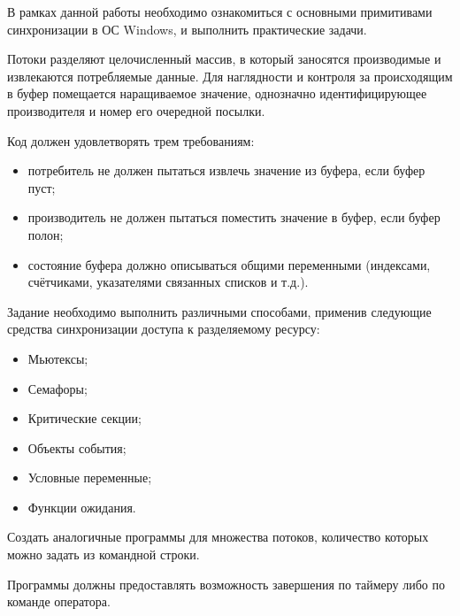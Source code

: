 \documentclass[a4paper, 12pt]{article}		%
\begin{document}
В рамках данной работы необходимо ознакомиться с основными примитивами синхронизации в ОС Windows, и выполнить практические задачи.
\vspace{2em}

Потоки разделяют целочисленный массив, в который заносятся производимые и извлекаются потребляемые данные. Для наглядности и контроля за происходящим в буфер помещается наращиваемое значение, однозначно идентифицирующее производителя и номер его очередной посылки.
\vspace{1em}

Код должен удовлетворять трем требованиям:
\begin{itemize}
\item потребитель не должен пытаться извлечь значение из буфера, если буфер пуст;
\item производитель не должен пытаться поместить значение в буфер, если буфер полон;
\item состояние буфера должно описываться общими переменными (индексами, счётчиками, указателями связанных списков и т.д.).
\end{itemize}
\vspace{1em}

Задание необходимо выполнить различными способами, применив следующие средства синхронизации доступа к разделяемому ресурсу:
\begin{itemize}
\item Мьютексы;
\item Семафоры;
\item Критические секции;
\item Объекты события;
\item Условные переменные;
\item Функции ожидания.
\end{itemize}

Создать аналогичные программы для множества потоков, количество которых можно задать из командной строки.

Программы должны предоставлять возможность завершения по таймеру либо по команде оператора.
\vspace{3em}
\end{document}

